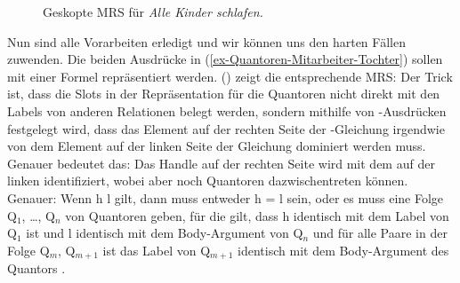 \begin{figure}
\caption{Geskopte MRS für \emph{Alle Kinder schlafen.}}\label{fig-Alle Kinder
  schlafen-scoped MRS}
\end{figure}

Nun sind alle Vorarbeiten erledigt und wir können uns den harten Fällen zuwenden. Die beiden
Ausdrücke in (\ref{ex-Quantoren-Mitarbeiter-Tochter}) sollen mit einer Formel repräsentiert
werden. () zeigt die entsprechende MRS:
\ea
\label{ex-Jede Tochter eines Mitarbeiters schläft-MRS}
\z
Der Trick ist, dass die Slots in der Repräsentation für die Quantoren nicht direkt mit den Labels
von anderen Relationen belegt werden, sondern mithilfe von \qeq-Ausdrücken festgelegt wird, dass das
Element auf der rechten Seite der \qeq-Gleichung irgendwie von dem Element auf der linken Seite der
Gleichung dominiert werden muss. Genauer bedeutet das: Das Handle auf der rechten Seite wird mit dem
auf der linken identifiziert, wobei aber noch Quantoren dazwischentreten können. Genauer: Wenn h
\qeq l gilt, dann muss entweder h = l sein, oder es muss eine Folge Q$_1$, \ldots, Q$_n$ von
Quantoren geben, für die gilt, dass h identisch mit dem Label von Q$_1$ ist und l identisch mit dem
Body-Argument von Q$_n$ und für alle Paare in der Folge Q$_m$, Q$_{m+1}$ ist das Label von Q$_{m+1}$
identisch mit dem Body-Argument des Quantors \citep[]{MRS}.  


